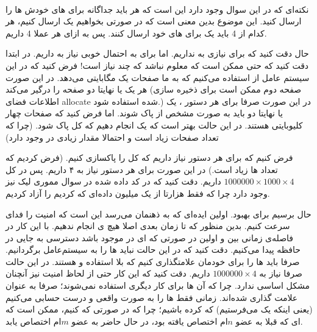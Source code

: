 \\\noindent
نکته‌ای که در این سوال وجود دارد این است که هر
باید جداگانه برای
های
خودش
ها
را ارسال کنید. این موضوع بدین معنی است که در صورتی بخواهیم یک
ارسال کنیم،‌ هر کدام از 4
باید یک
برای
های خود ارسال کنند.
پس به ازای هر
عملا
4
داریم.

حال دقت کنید که برای
نیازی به
نداریم. اما برای
به احتمال خوبی نیاز به
داریم. در ابتدا دقت کنید که حتی ممکن است که معلوم نباشد که چند
نیاز است! فرض کنید که در این سیستم عامل از
استفاده می‌کنیم که به ما صفحات یک مگابایتی می‌دهد. در این صورت هر
یک یا نهایتا دو صفحه را درگیر می‌کند (صفحه دوم ممکن است برای ذخیره سازی اطلاعات فضای allocate شده استفاده شود.)
در این صورت صرفا برای هر دستور
،
یک یا نهایتا دو
باید به صورت مشخص از
پاک شوند.
اما فرض کنید که صفحات چهار کلیوبایتی هستند. در این حالت بهتر است که یک
انجام دهیم که کل
پاک شود. (چرا که تعداد صفحات زیاد است و احتمالا مقدار زیادی  در  وجود دارد)

فرض کنیم که برای هر دستور
نیاز داریم که کل
را پاکسازی کنیم. (فرض کردیم که تعداد ها زیاد است.)
در این صورت برای هر دستور
نیاز به ۴
داریم. پس در کل
$1000000 \times 1000 \times 4$
داریم. دقت کنید که در کد داده شده در سوال مموری لیک نیز وجود دارد چرا که فقط هزارتا
از یک میلیون داده‌ای که
کردیم را آزاد کردیم.

حال برسیم برای بهبود. اولین ایده‌ای که به ذهنمان می‌رسد این است که امنیت را فدای سرعت کنیم.
بدین منظور که تا زمان
بعدی اصلا هیچ
ی
انجام ندهیم. با این کار در فاصله‌ی زمانی بین
 و اولین 
در صورتی که
ای
در
موجود باشد دسترسی به جایی
در حافظه پیدا می‌کنیم. دقت کنید که در این حالت نباید
ها
را به سیستم‌عامل برگردانیم. صرفا باید
ها
را برای خودمان علامتگذاری کنیم که بلا استفاده و
هستند. در این حالت صرفا نیاز به
$1000000 \times 4$
داریم. دقت کنید که این کار حتی از لحاظ امنیت نیز آنچنان مشکل اساسی ندارد.
چرا که آن
ها
برای کار دیگری استفاده نمی‌شوند؛ صرفا به عنوان
علامت گذاری شده‌اند. زمانی فقط
ها
را به صورت واقعی و درست حسابی
می‌کنیم
(یعنی اینکه یک  می‌فرستیم)
که
کرده باشیم؛ چرا که در صورتی که
کنیم، ممکن است که
ای
که قبلا به عضو
$n$ام
اختصاص یافته بود، در حال حاضر به عضو
$m$ام
اختصاص یابد.

